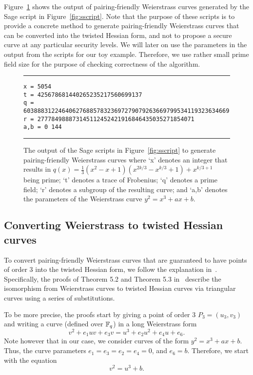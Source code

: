 Figure~\ref{fig:sout} shows the output of
pairing-friendly Weierstrass curves generated by the Sage script in Figure~\ref{fig:sscript}.
Note that the purpose of these scripts is to provide a concrete method to generate
pairing-friendly Weierstrass curves that can be converted into the twisted Hessian form,
and not to propose a secure curve at any particular security levels.
We will later on use the parameters in the output from the scripts for our toy example.
Therefore, we use rather small prime field size for the purpose of checking correctness of the algorithm.

\begin{figure}
\hrule\medskip
{\scriptsize
\begin{verbatim}
x = 5054
t = 425678681440265235217560699137
q = 60388831224640627688578323697279079263669799534119323634669
r = 277784988873145112452421916846435035271854071
a,b = 0 144
\end{verbatim}
}
\hrule
\caption{The output of the Sage scripts in Figure~\ref{fig:sscript}
to generate pairing-friendly Weierstrass curves where
`x' denotes an integer that results in $q(x) = \frac{1}{3} (x^2 - x + 1) (x^{2k/3} - x^{k/3} + 1) + x^{k/3+1}$ being prime;
`t' denotes a trace of Frobenius;
`q' denotes a prime field;
`r' denotes a subgroup of the resulting curve; and
`a,b' denotes the parameters of the Weierstrass curve $y^2 = x^3 + ax + b$.
}
\label{fig:sout}
\end{figure}



\subsection{Converting Weierstrass to twisted Hessian curves}
\label{subsec:w2h}

To convert pairing-friendly Weierstrass curves that are guaranteed to have points of order 3
into the twisted Hessian form, we follow the explanation in~\cite{2015/hessian}.
Specifically, the proofs of Theorem 5.2 and {Theorem 5.3} in~\cite{2015/hessian} describe the isomorphism from
Weierstrass curves to twisted Hessian curves via triangular curves using a series of substitutions.

To be more precise, the proofs start by giving a point of order 3 $P_3 = (u_3,v_3)$ and
writing a curve (defined over $\mathbb{F}_{q}$) in a long Weierstrass form
$$ v^2 + e_1 uv + e_3 v = u^3 + e_2 u^2 + e_4 u + e_6. $$
Note however that in our case, we consider curves of the form $y^2 = x^3 + ax + b$.
Thus, the curve parameters $e_1 = e_3 = e_2 = e_4 = 0$, and $e_6 = b$.
Therefore, we start with the equation
$$v^2 = u^3 + b.$$

